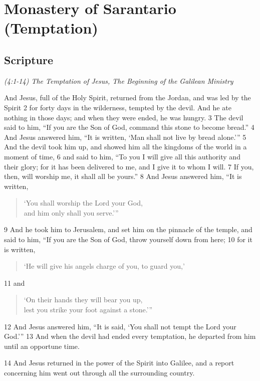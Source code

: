 \documentclass[letterpaper]{report}
\begin{document}
\clearpage
\section{Monastery of Sarantario (Temptation)}
\begin{multicols}{2}
	\mbox{}
\end{multicols}
\subsection{Scripture}

{\centering
	\emph{(4:1-14) The Temptation of Jesus,
		The Beginning of the Galilean Ministry}\
}
\begin{multicols}{2}
And Jesus, full of the Holy Spirit, returned from the Jordan, and was led by the Spirit 2 for forty days in the wilderness, tempted by the devil. And he ate nothing in those days; and when they were ended, he was hungry. 3 The devil said to him, “If you are the Son of God, command this stone to become bread.” 4 And Jesus answered him, “It is written, ‘Man shall not live by bread alone.’” 5 And the devil took him up, and showed him all the kingdoms of the world in a moment of time, 6 and said to him, “To you I will give all this authority and their glory; for it has been delivered to me, and I give it to whom I will. 7 If you, then, will worship me, it shall all be yours.” 8 And Jesus answered him, “It is written,

\begin{verse}
‘You shall worship the Lord your God,\\
and him only shall you serve.’”\\
\end{verse}

9 And he took him to Jerusalem, and set him on the pinnacle of the temple, and said to him, “If you are the Son of God, throw yourself down from here; 10 for it is written,

\begin{verse}
‘He will give his angels charge of you, to guard you,’\\
\end{verse}

11 and

\begin{verse}
‘On their hands they will bear you up,\\
lest you strike your foot against a stone.’”\\
\end{verse}

12 And Jesus answered him, “It is said, ‘You shall not tempt the Lord your God.’” 13 And when the devil had ended every temptation, he departed from him until an opportune time.

14 And Jesus returned in the power of the Spirit into Galilee, and a report concerning him went out through all the surrounding country.
\end{multicols}
\end{document}
